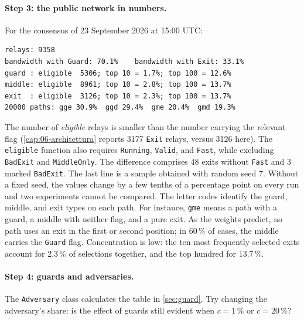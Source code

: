 \paragraph{Step 3: the public network in numbers.} For the consensus of 23 September 2026 at 15:00 UTC:
\begin{lstlisting}[numbers=none]
relays: 9358
bandwidth with Guard: 70.1%    bandwidth with Exit: 33.1%
guard : eligible  5306; top 10 = 1.7%; top 100 = 12.6%
middle: eligible  8961; top 10 = 2.8%; top 100 = 13.7%
exit  : eligible  3126; top 10 = 2.3%; top 100 = 13.7%
20000 paths: gge 30.9%  ggd 29.4%  gme 20.4%  gmd 19.3%
\end{lstlisting}
The number of \emph{eligible} relays is smaller than the number carrying the relevant flag (\cref{cap:06-architettura} reports 3177 \texttt{Exit} relays, versus 3126 here). The \texttt{eligible} function also requires \texttt{Running}, \texttt{Valid}, and \texttt{Fast}, while excluding \texttt{BadExit} and \texttt{MiddleOnly}. The difference comprises 48 exits without \texttt{Fast} and 3 marked \texttt{BadExit}.
The last line is a sample obtained with random seed 7. Without a fixed seed, the values change by a few tenths of a percentage point on every run and two experiments cannot be compared. The letter codes identify the guard, middle, and exit types on each path. For instance, \texttt{gme} means a path with a guard, a middle with neither flag, and a pure exit. As the weights predict, no path uses an exit in the first or second position; in 60\,\% of cases, the middle carries the \texttt{Guard} flag. Concentration is low: the ten most frequently selected exits account for 2.3\,\% of selections together, and the top hundred for 13.7\,\%.

\paragraph{Step 4: guards and adversaries.} The \texttt{Adversary} class calculates the table in \cref{sec:guard}. Try changing the adversary's share: is the effect of guards still evident when $c = 1\,\%$ or $c = 20\,\%$?

